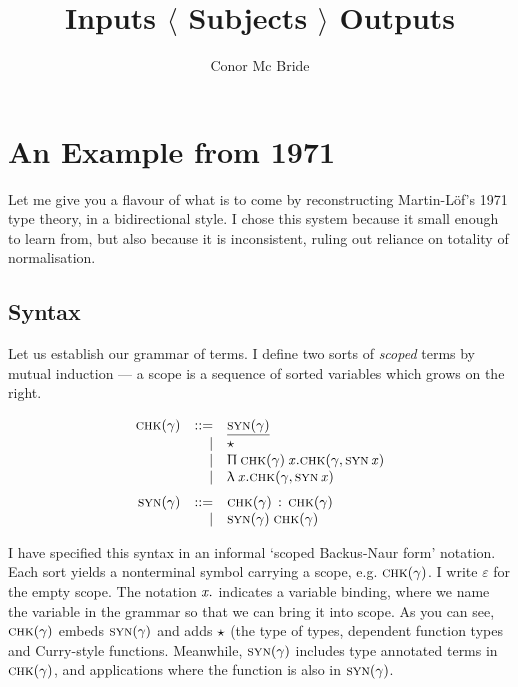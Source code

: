 \documentclass[format=acmsmall, screen, review, anonymous, timestamp]{acmart}
\newcommand{\V}[1]{\purple{\mathit{#1}}}
\newcommand{\ra}[2]{#1 \,:\, #2}
\newcommand{\Ne}{\underline}
\newcommand{\PI}{\blue{\Uppi}}
\newcommand{\x}[1]{\V{x_{\mathrm{#1}}}}
\newcommand{\Ty}{\blue{\star}}
\newcommand{\emp}{\varepsilon}
\begin{document}
\title{Inputs $\langle$ Subjects $\rangle$ Outputs}
\author{Conor Mc Bride}
\maketitle

\section{An Example from 1971}

Let me give you a flavour of what is to come by reconstructing Martin-L\"of's 1971 type theory, in a bidirectional style. I chose this system because it small enough to learn from, but also because it is inconsistent, ruling out reliance on totality of normalisation.


\subsection{Syntax}

Let us establish our grammar of terms. I define two sorts of \emph{scoped} terms by mutual induction --- a scope is a sequence of sorted variables which grows on the right.
\newcommand{\syso}{\textsc}
\newcommand{\chk}[1]{\syso{chk}(#1)}
\newcommand{\syn}[1]{\syso{syn}(#1)}
\newcommand{\bva}[2]{\syso{#1}\,{\V{#2}}}
\newcommand{\PT}[3]{\PI\:#1\:\V{#2}.#3}
\newcommand{\LA}{\red{\uplambda}}
\newcommand{\LF}[2]{\LA\:\V{#1}.#2}

\[\begin{array}{rrl}
    \chk\gamma & ::= & \Ne{\syn\gamma} \\
               &   | & \Ty \\
               &   | & \PT {\chk\gamma}x{\chk{\gamma,\bva{syn}x}}\\
               &   | & \LF x{\chk{\gamma,\bva{syn}x}}
                       \medskip\\
    \syn\gamma & ::= & \ra{\chk\gamma}{\chk\gamma}\\
               &   | & \syn\gamma\;\chk\gamma
\end{array}\]

I have specified this syntax in an informal `scoped Backus-Naur form'
notation. Each sort yields a nonterminal symbol carrying a scope,
e.g. $\chk\gamma$. I write $\emp$ for the empty scope. The notation ${\x{}.}$ indicates a variable binding, where we name the variable in the grammar so that we can bring it into scope. As you can see, $\chk\gamma$ embeds $\syn\gamma$ and adds $\Ty$ (the type of types, dependent function types and Curry-style functions. Meanwhile, $\syn\gamma$ includes type annotated terms in $\chk\gamma$, and applications where the function is also in $\syn\gamma$.
\end{document}
